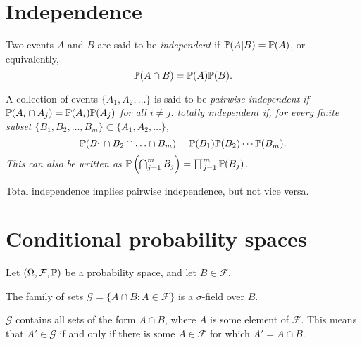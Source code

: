 \section{Independence}
\begin{definition}
Two events $A$ and $B$ are said to be \emph{independent} if $\mathbb{P}(A|B)=\mathbb{P}(A)$, or equivalently,
\[
\mathbb{P}(A\cap B) = \mathbb{P}(A)\mathbb{P}(B).
\]
\end{definition}

\begin{definition}
A collection of events $\{A_1,A_2,\ldots\}$ is said to be 
\ben
\it \emph{pairwise independent} if $\mathbb{P}(A_i\cap A_j)=\mathbb{P}(A_i)\mathbb{P}(A_j)$ for all $i\neq j$.
\it \emph{totally independent} if, for every finite subset 
$\{B_1,B_2,\ldots,B_m\}\subset \{A_1,A_2,\ldots\}$, 
\[
\mathbb{P}(B_1\cap B_2\cap \ldots \cap B_m) = \mathbb{P}(B_1)\mathbb{P}(B_2)\cdots\mathbb{P}(B_m).
\]
This can also be written as $\mathbb{P}\left(\bigcap_{j=1}^m B_j\right) = \prod_{j=1}^m \mathbb{P}(B_j)$.
\een
\end{definition}

\begin{remark}
Total independence implies pairwise independence, but not vice versa.
\end{remark}

\section{Conditional probability spaces}
Let $(\Omega,\mathcal{F},\mathbb{P})$ be a probability space, and let $B\in\mathcal{F}$.
	
\begin{theorem}\label{thm:cond_sigma_field}
The family of sets $\mathcal{G} = \{A\cap B: A\in\mathcal{F}\}$ is a $\sigma$-field over $B$.
\end{theorem}

\begin{remark}
$\mathcal{G}$ contains all sets of the form $A\cap B$, where $A$ is some element of $\mathcal{F}$. This means that $A'\in\mathcal{G}$ if and only if there is some $A\in\mathcal{F}$ for which $A'=A\cap B$.
\end{remark}

